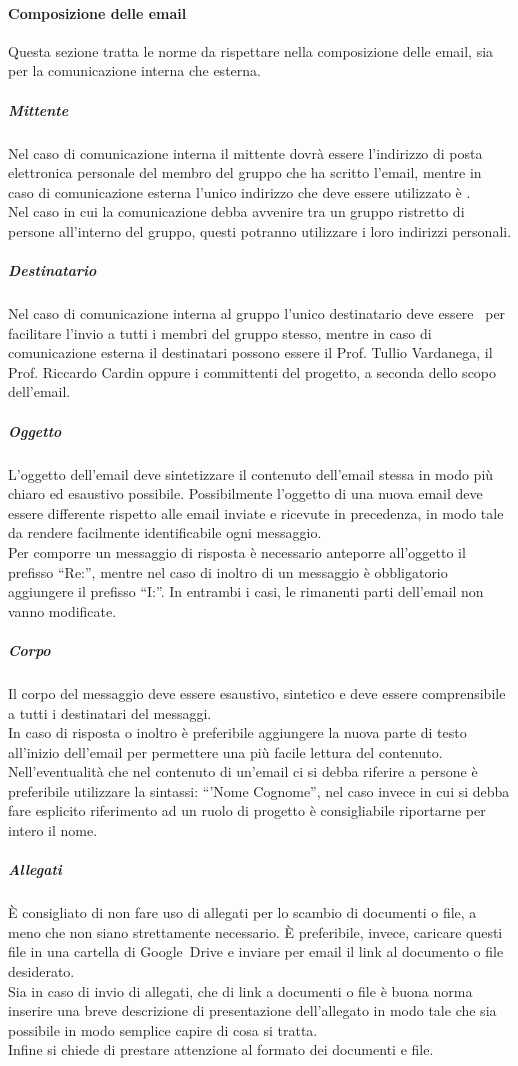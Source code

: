 \documentclass[../NormeProgetto.tex]{subfiles}
\begin{document}
			\paragraph{Composizione delle email}
			Questa sezione tratta le norme da rispettare nella composizione delle email, sia per la comunicazione interna che esterna.
			\subparagraph{Mittente}
			Nel caso di comunicazione interna il mittente dovrà essere l'indirizzo di posta elettronica personale del membro del gruppo che ha scritto l'email, mentre in caso di comunicazione esterna l'unico indirizzo che deve essere utilizzato è \mailleaf. \\ Nel caso in cui la comunicazione debba avvenire tra un gruppo ristretto di persone all'interno del gruppo, questi potranno utilizzare i loro indirizzi personali.
			\subparagraph{Destinatario}
			Nel caso di comunicazione interna al gruppo l'unico destinatario deve essere \mailleaf\ per facilitare l'invio a tutti i membri del gruppo stesso, mentre in caso di comunicazione esterna il destinatari possono essere il Prof. Tullio Vardanega, il Prof. Riccardo Cardin oppure i committenti del progetto, a seconda dello scopo dell'email.
			\subparagraph{Oggetto}
			L'oggetto dell'email deve sintetizzare il contenuto dell'email stessa in modo più chiaro ed esaustivo possibile. Possibilmente l'oggetto di una nuova email deve essere differente rispetto alle email inviate e ricevute in precedenza, in modo tale da rendere facilmente identificabile ogni messaggio. \\ Per comporre un messaggio di risposta è necessario anteporre all'oggetto il prefisso ``Re:'', mentre nel caso di inoltro di un messaggio è obbligatorio aggiungere il prefisso ``I:''. In entrambi i casi, le rimanenti parti dell'email non vanno modificate.
			\subparagraph{Corpo}
			Il corpo del messaggio deve essere esaustivo, sintetico e deve essere comprensibile a tutti i destinatari del messaggi. \\ In caso di risposta o inoltro è preferibile aggiungere la nuova parte di testo all'inizio dell'email per permettere una più facile lettura del contenuto. \\ Nell'eventualità che nel contenuto di un'email ci si debba riferire a persone è preferibile utilizzare la sintassi: ``'Nome Cognome'', nel caso invece in cui si debba fare esplicito riferimento ad un ruolo di progetto è consigliabile riportarne per intero il nome.
			\subparagraph{Allegati}
			È consigliato di non fare uso di allegati per lo scambio di documenti o file, a meno che non siano strettamente necessario. È preferibile, invece, caricare questi file in una cartella di Google\g\ Drive e inviare per email il link al documento o file desiderato. \\ Sia in caso di invio di allegati, che di link a documenti o file è buona norma inserire una breve descrizione di presentazione dell'allegato in modo tale che sia possibile in modo semplice capire di cosa si tratta. \\ Infine si chiede di prestare attenzione al formato dei documenti e file.
\end{document}
